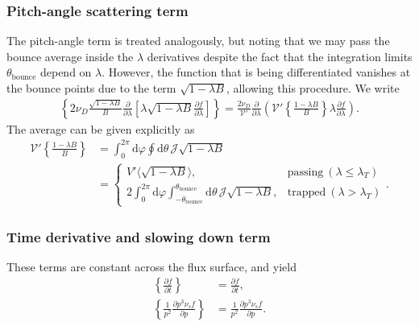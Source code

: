 \documentclass[11pt,a4paper]{article}
\newcommand{\rd}{\ensuremath{\mathrm{d}}}
\newcommand{\sub}[1]{\ensuremath{_{\text{#1}}}}
\begin{document}
\subsubsection*{Pitch-angle scattering term}
The pitch-angle term is treated analogously, but noting that we may pass the bounce average inside the $\lambda$ derivatives despite the fact that the integration limits $\theta\sub{bounce}$ depend on $\lambda$. However, the function that is being differentiated vanishes at the bounce points due to the term $\sqrt{1-\lambda B}$, allowing this procedure. We write
\begin{align}
\left\{2\nu_D\frac{\sqrt{1-\lambda B}}{B}\frac{\partial}{\partial \lambda}\left[\lambda \sqrt{1-\lambda B}\frac{\partial f}{\partial \lambda}\right] \right\} = \frac{2\nu_D}{\mathcal{V}'}\frac{\partial}{\partial \lambda}\left(  \mathcal{V'}\left\{\frac{1-\lambda B}{B}\right\} \lambda\frac{\partial f}{\partial \lambda}\right).
\end{align}
The average can be given explicitly as
\begin{align}
\mathcal{V'}\left\{\frac{1-\lambda B}{B}\right\} &= \int_0^{2\pi}\rd \varphi \oint \rd \theta \, \mathcal{J}\sqrt{1-\lambda B}\nonumber \\
&=\begin{cases}
V' \langle \sqrt{1-\lambda B} \rangle, & \text{passing}~(\lambda \leq \lambda_T) \\
2\int_0^{2\pi}\rd\varphi\int_{-\theta\sub{bounce}}^{\theta\sub{bounce}} \rd\theta \,\mathcal{J}\sqrt{1-\lambda B}, & \text{trapped} ~(\lambda > \lambda_T)
\end{cases}.
\end{align}

\subsubsection*{Time derivative and slowing down term}
These terms are constant across the flux surface, and yield
\begin{align}
\left\{ \frac{\partial f}{\partial t}\right\} &= \frac{\partial f}{\partial t} , \nonumber \\
\left\{\frac{1}{p^2}\frac{\partial p^3\nu_s f }{\partial p}\right\} &= \frac{1}{p^2}\frac{\partial p^3\nu_s f }{\partial p}.
\end{align}
\end{document}
